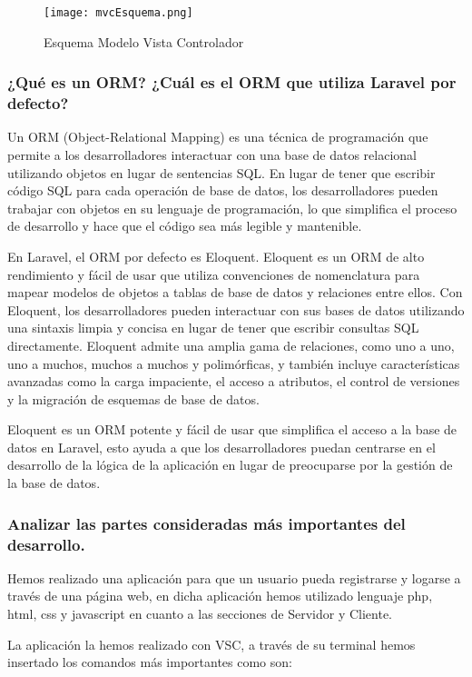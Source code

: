 \documentclass{article}
\begin{document}
\begin{enumerate}
\begin{figure}[!]
\centering
\texttt{[image: mvcEsquema.png]}
\caption{\label{fig:011} Esquema Modelo Vista Controlador }
\end{figure}

\subsubsection{¿Qué es un ORM? ¿Cuál es el ORM que utiliza Laravel por defecto?}
Un ORM (Object-Relational Mapping) es una técnica de programación que permite a los desarrolladores interactuar con una base de datos relacional utilizando objetos en lugar de sentencias SQL. En lugar de tener que escribir código SQL para cada operación de base de datos, los desarrolladores pueden trabajar con objetos en su lenguaje de programación, lo que simplifica el proceso de desarrollo y hace que el código sea más legible y mantenible.

En Laravel, el ORM por defecto es Eloquent. Eloquent es un ORM de alto rendimiento y fácil de usar que utiliza convenciones de nomenclatura para mapear modelos de objetos a tablas de base de datos y relaciones entre ellos. Con Eloquent, los desarrolladores pueden interactuar con sus bases de datos utilizando una sintaxis limpia y concisa en lugar de tener que escribir consultas SQL directamente. Eloquent admite una amplia gama de relaciones, como uno a uno, uno a muchos, muchos a muchos y polimórficas, y también incluye características avanzadas como la carga impaciente, el acceso a atributos, el control de versiones y la migración de esquemas de base de datos.

Eloquent es un ORM potente y fácil de usar que simplifica el acceso a la base de datos en Laravel, esto ayuda a que los desarrolladores puedan centrarse en el desarrollo de la lógica de la aplicación en lugar de preocuparse por la gestión de la base de datos.

\subsubsection{Analizar las partes consideradas más importantes del desarrollo.}
Hemos realizado una aplicación para que un usuario pueda registrarse y logarse a través de una página web, en dicha aplicación hemos utilizado lenguaje php, html, css y javascript en cuanto a las secciones de Servidor y Cliente.

La aplicación la hemos realizado con VSC, a través de su terminal hemos insertado los comandos más importantes como son: 


\end{enumerate}
\end{document}
